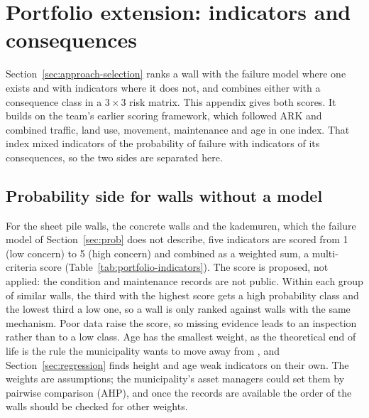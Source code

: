 \chapter{Portfolio extension: indicators and consequences}
\label{app:portfolio}

Section~\ref{sec:approach-selection} ranks a wall with the failure model where
one exists and with indicators where it does not, and combines either with a
consequence class in a $3\times3$ risk matrix. This appendix gives both scores.
It builds on the team's earlier scoring framework, which followed ARK
\parencite{ark2023} and combined traffic, land use, movement, maintenance and
age in one index. That index mixed indicators of the probability of failure
with indicators of its consequences, so the two sides are separated here.

\section{Probability side for walls without a model}\label{app:portfolio-hazard}

For the sheet pile walls, the concrete walls and the kademuren, which the
failure model of Section~\ref{sec:prob} does not describe, five indicators are
scored from 1 (low concern) to 5 (high concern) and combined as a weighted sum,
a multi-criteria score (Table~\ref{tab:portfolio-indicators}). The score is proposed, not applied: the
condition and maintenance records are not public. Within each group of similar
walls, the third with the highest score gets a high probability class and the
lowest third a low one, so a wall is only ranked against walls with the same
mechanism. Poor data raise the score, so missing evidence leads to an
inspection rather than to a low class. Age has the smallest weight, as the
theoretical end of life is the rule the municipality wants to move away from
\parencite{utrecht_teamchallenge2026}, and Section~\ref{sec:regression} finds
height and age weak indicators on their own. The weights are assumptions; the
municipality's asset managers could set them by pairwise comparison (AHP), and
once the records are available the order of the walls should be checked for
other weights.

